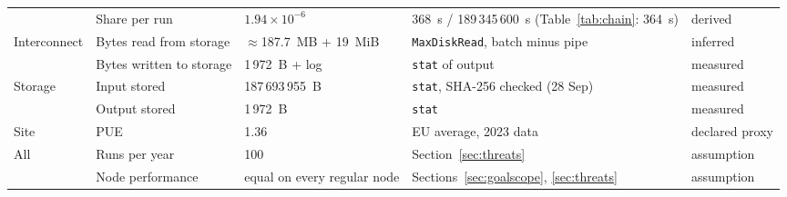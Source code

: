 \documentclass[conference,a4paper]{IEEEtran}
\begin{document}
\begin{table}[!t]
\begin{tabular}{@{}lllll@{}}
             & Share per run & $1.94\times10^{-6}$ & 368~s / 189\,345\,600~s (Table~\ref{tab:chain}: 364~s) & derived \\
Interconnect & Bytes read from storage & $\approx$187.7~MB + 19~MiB & \texttt{MaxDiskRead}, batch minus pipe & inferred \\
             & Bytes written to storage & 1\,972~B + log & \texttt{stat} of output & measured \\
Storage      & Input stored & 187\,693\,955~B & \texttt{stat}, SHA-256 checked (28 Sep) & measured \\
             & Output stored & 1\,972~B & \texttt{stat} & measured \\
Site         & PUE & 1.36 & EU average, 2023 data~\cite{eudc2025} & declared proxy \\
All          & Runs per year & 100 & Section~\ref{sec:threats} & assumption \\
             & Node performance & equal on every regular node & Sections~\ref{sec:goalscope}, \ref{sec:threats} & assumption \\
\bottomrule
\end{tabular}
\end{table}
\end{document}
